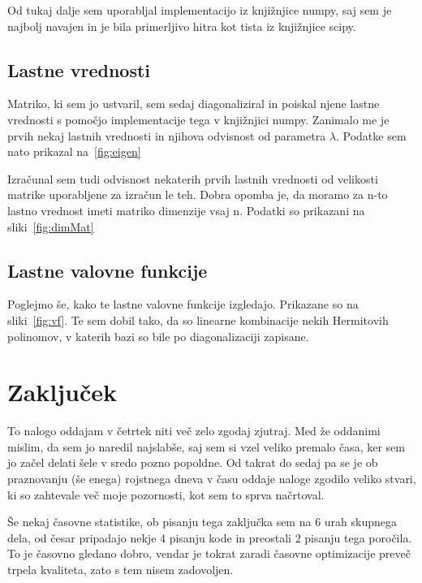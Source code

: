 \documentclass{porocilo}
\begin{document}
Od tukaj dalje sem uporabljal implementacijo iz knjižnjice numpy, saj sem je najbolj navajen in je bila primerljivo hitra kot tista iz knjižnjice scipy.

\subsection{Lastne vrednosti}
Matriko, ki sem jo ustvaril, sem sedaj diagonaliziral in poiskal njene lastne vrednosti s pomočjo implementacije tega v knjižnjici numpy. Zanimalo me je prvih nekaj lastnih vrednosti in njihova odvisnost od parametra $\lambda$. Podatke sem nato prikazal na~\ref{fig:eigen}


Izračunal sem tudi odvisnost nekaterih prvih lastnih vrednosti od velikosti matrike uporabljene za izračun le teh. Dobra opomba je, da moramo za n-to lastno vrednost imeti matriko dimenzije vsaj n. Podatki so prikazani na sliki~\ref{fig:dimMat}


\subsection{Lastne valovne funkcije}
Poglejmo še, kako te lastne valovne funkcije izgledajo. Prikazane so na sliki~\ref{fig:vf}. Te sem dobil tako, da so linearne kombinacije nekih Hermitovih polinomov, v katerih bazi so bile po diagonalizaciji zapisane.


\newpage
\section{Zaključek}
To nalogo oddajam v četrtek niti več zelo zgodaj zjutraj. Med že oddanimi mislim, da sem jo naredil najslabše, saj sem si vzel veliko premalo časa, ker sem jo začel delati šele v sredo pozno popoldne. Od takrat do sedaj pa se je ob praznovanju (še enega) rojstnega dneva v času oddaje naloge zgodilo veliko stvari, ki so zahtevale več moje pozornosti, kot sem to sprva načrtoval.

Še nekaj časovne statistike, ob pisanju tega zaključka sem na 6 urah skupnega dela, od česar pripadajo nekje 4 pisanju kode in preostali 2 pisanju tega poročila. To je časovno gledano dobro, vendar je tokrat zaradi časovne optimizacije preveč trpela kvaliteta, zato s tem nisem zadovoljen.
\end{document}
